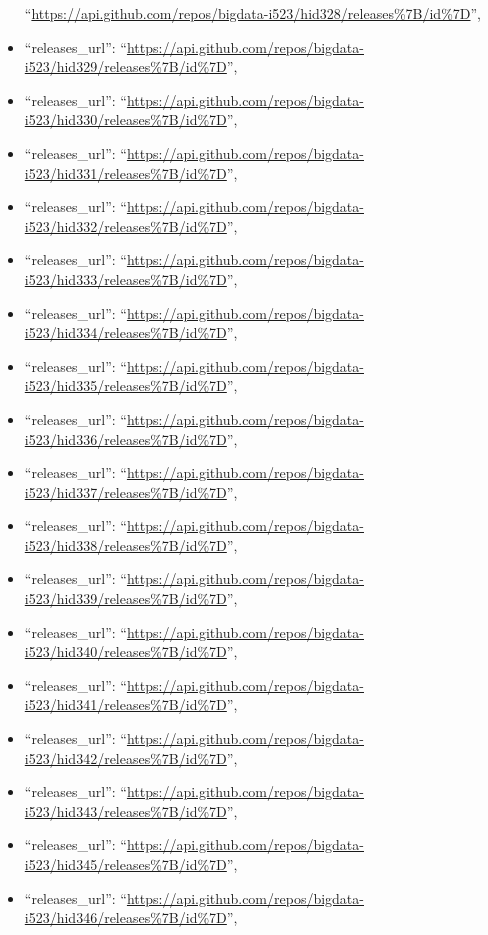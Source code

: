 \begin{itemize}
  ``\url{https://api.github.com/repos/bigdata-i523/hid328/releases\%7B/id\%7D}'',
\item
  ``releases\_url'':
  ``\url{https://api.github.com/repos/bigdata-i523/hid329/releases\%7B/id\%7D}'',
\item
  ``releases\_url'':
  ``\url{https://api.github.com/repos/bigdata-i523/hid330/releases\%7B/id\%7D}'',
\item
  ``releases\_url'':
  ``\url{https://api.github.com/repos/bigdata-i523/hid331/releases\%7B/id\%7D}'',
\item
  ``releases\_url'':
  ``\url{https://api.github.com/repos/bigdata-i523/hid332/releases\%7B/id\%7D}'',
\item
  ``releases\_url'':
  ``\url{https://api.github.com/repos/bigdata-i523/hid333/releases\%7B/id\%7D}'',
\item
  ``releases\_url'':
  ``\url{https://api.github.com/repos/bigdata-i523/hid334/releases\%7B/id\%7D}'',
\item
  ``releases\_url'':
  ``\url{https://api.github.com/repos/bigdata-i523/hid335/releases\%7B/id\%7D}'',
\item
  ``releases\_url'':
  ``\url{https://api.github.com/repos/bigdata-i523/hid336/releases\%7B/id\%7D}'',
\item
  ``releases\_url'':
  ``\url{https://api.github.com/repos/bigdata-i523/hid337/releases\%7B/id\%7D}'',
\item
  ``releases\_url'':
  ``\url{https://api.github.com/repos/bigdata-i523/hid338/releases\%7B/id\%7D}'',
\item
  ``releases\_url'':
  ``\url{https://api.github.com/repos/bigdata-i523/hid339/releases\%7B/id\%7D}'',
\item
  ``releases\_url'':
  ``\url{https://api.github.com/repos/bigdata-i523/hid340/releases\%7B/id\%7D}'',
\item
  ``releases\_url'':
  ``\url{https://api.github.com/repos/bigdata-i523/hid341/releases\%7B/id\%7D}'',
\item
  ``releases\_url'':
  ``\url{https://api.github.com/repos/bigdata-i523/hid342/releases\%7B/id\%7D}'',
\item
  ``releases\_url'':
  ``\url{https://api.github.com/repos/bigdata-i523/hid343/releases\%7B/id\%7D}'',
\item
  ``releases\_url'':
  ``\url{https://api.github.com/repos/bigdata-i523/hid345/releases\%7B/id\%7D}'',
\item
  ``releases\_url'':
  ``\url{https://api.github.com/repos/bigdata-i523/hid346/releases\%7B/id\%7D}'',

\end{itemize}
